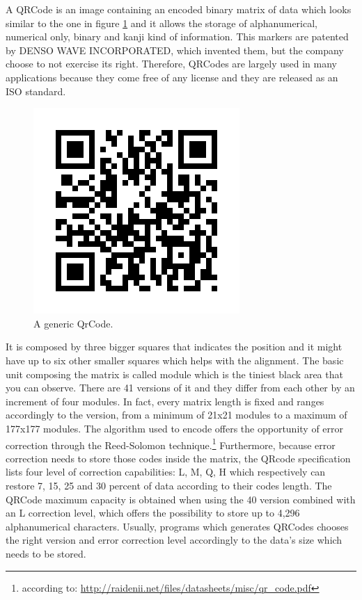 A QRCode is an image containing an encoded binary matrix of data which looks similar to the one in figure \ref{qr} and it allows the storage of alphanumerical, numerical only, binary and kanji kind of information.
This markers are patented by DENSO WAVE INCORPORATED, which invented them, but the company choose to not exercise its right.
Therefore, QRCodes are largely used in many applications because they come free of any license and they are released as an ISO standard.

\begin{figure}[hbt]
    \centering
    \includegraphics[scale=0.5]{img/qr.png}
    \caption{A generic QrCode. \label{qr}}
\end{figure}

It is composed by three bigger squares that indicates the position and it might have up to six other smaller squares which helps with the alignment. The basic unit composing the matrix is called module which is the tiniest black area that you can observe. There are 41 versions of it and they differ from each other by an increment of four modules. In fact, every matrix length is fixed and ranges accordingly to the version, from a minimum of 21x21 modules to a maximum of 177x177 modules. The algorithm used to encode offers the opportunity of error correction through the Reed-Solomon technique.\footnote{ according to: \url{http://raidenii.net/files/datasheets/misc/qr_code.pdf}}
Furthermore, because error correction needs to store those codes inside the matrix, the QRcode specification lists four level of correction capabilities: L, M, Q, H which respectively can restore 7, 15, 25 and 30 percent of data according to their codes length\cite{qrerror}.
The QRCode maximum capacity is obtained when using the 40 version combined with an L correction level, which offers the possibility to store up to 4,296 alphanumerical characters\cite{qrversions}.
Usually, programs which generates QRCodes chooses the right version and error correction level accordingly to the data's size which needs to be stored.

